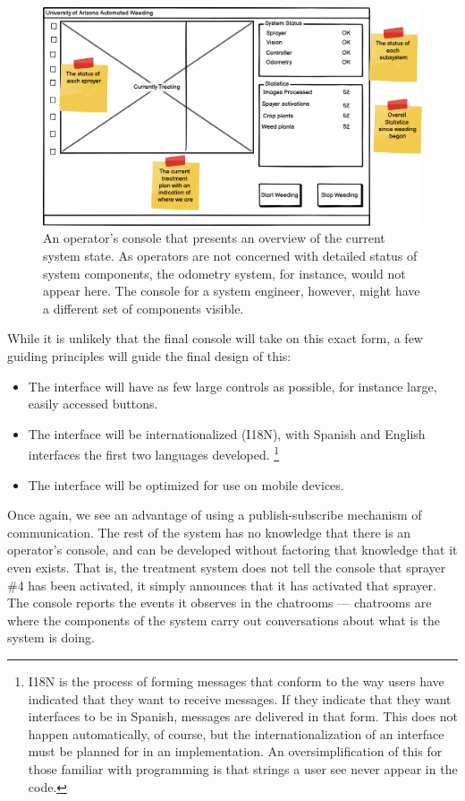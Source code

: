 \documentclass[12pt]{article}
\begin{document}
{\begin{figure}[H]
	\centering
	\includegraphics[width=0.75\linewidth]{./figures/console-operator.png}
	\caption[An operator's console]{An operator's console that presents an overview of the current system state. As operators are not concerned with detailed status of system components, the odometry system, for instance, would not appear here.  The console for a system engineer, however, might have a different set of components visible.}
	\label{fig:console-operator}
\end{figure}

While it is unlikely that the final console will take on this exact form, a few guiding principles will guide the final design of this:
\begin{itemize}
	\item{The interface will have as few large controls as possible, for instance large, easily accessed buttons.}
	\item{The interface will be internationalized (I18N), with Spanish and English interfaces the first two languages developed. \footnote{I18N is the process of forming messages that conform to the way users have indicated that they want to receive messages. If they indicate that they want interfaces to be in Spanish, messages are delivered in that form. This does not happen automatically, of course, but the internationalization of an interface must be planned for in an implementation. An oversimplification of this for those familiar with programming is that strings a user see never appear in the code.}}
	\item{The interface will be optimized for use on mobile devices.}
\end{itemize}

Once again, we see an advantage of using a publish-subscribe mechanism of communication. The rest of the system has no knowledge that there is an operator's console, and can be developed without factoring that knowledge that it even exists. That is, the treatment system does not tell the console that sprayer \#4 has been activated, it simply announces that it has activated that sprayer.  The console reports the events it observes in the chatrooms --- chatrooms are where the components of the system carry out conversations about what is the system is doing.

}
\end{document}
